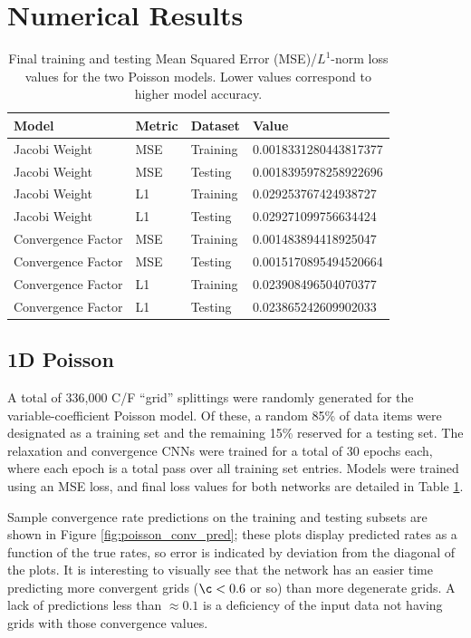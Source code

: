 \documentclass[review]{siamart190516}
\begin{document}
\section{Numerical Results}\label{sec:num}

\begin{table}[t]
\centering
\begin{tabular}{|l|l|l|l|}
\hline
Model & Metric & Dataset & Value \\

\hline
Jacobi Weight & MSE & Training & 0.0018331280443817377 \\
Jacobi Weight & MSE & Testing & 0.0018395978258922696 \\
Jacobi Weight & L1 & Training & 0.029253767424938727 \\
Jacobi Weight & L1 & Testing & 0.029271099756634424 \\
\hline
Convergence Factor & MSE & Training & 0.001483894418925047 \\
Convergence Factor & MSE & Testing & 0.0015170895494520664 \\
Convergence Factor & L1 & Training & 0.023908496504070377 \\
Convergence Factor & L1 & Testing & 0.023865242609902033 \\
\hline
\end{tabular}
\caption{Final training and testing Mean Squared Error (MSE)/$L^1$-norm loss values for the two Poisson models.  Lower values correspond to higher model accuracy.}
\label{tab:poisson_loss}
\end{table}

\subsection{1D Poisson}

A total of 336,000 C/F ``grid'' splittings were randomly generated for the variable-coefficient Poisson model.  Of these, a random 85\% of data items were designated as a training set and the remaining 15\% reserved for a testing set.  The relaxation and convergence CNNs were trained for a total of 30 epochs each, where each epoch is a total pass over all training set entries.  Models were trained using an MSE loss, and final loss values for both networks are detailed in Table \ref{tab:poisson_loss}.

Sample convergence rate predictions on the training and testing subsets are shown in Figure \ref{fig:poisson_conv_pred}; these plots display predicted rates as a function of the true rates, so error is indicated by deviation from the diagonal of the plots.  It is interesting to visually see that the network has an easier time predicting more convergent grids ($\c < 0.6$ or so) than more degenerate grids.  A lack of predictions less than $\approx 0.1$ is a deficiency of the input data not having grids with those convergence values.
\end{document}
